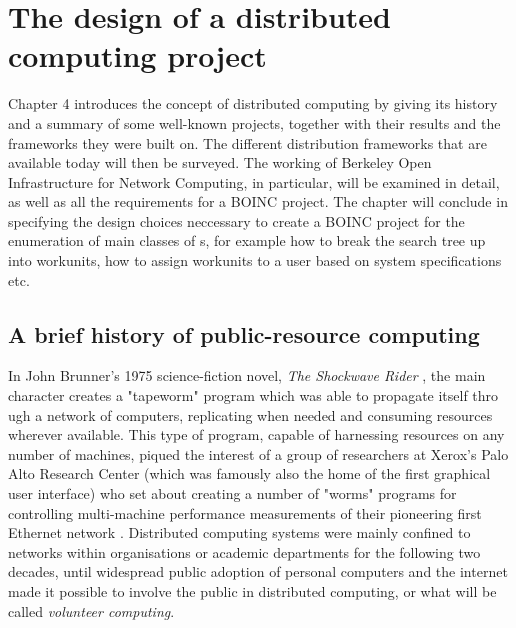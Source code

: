 \chapter{The design of a distributed computing project}
\vspace{-2em}
\minitoc

Chapter 4 introduces the concept of distributed computing by  giving its history and a summary of some well-known projects, together with their results and the frameworks they were built on. The different distribution frameworks that are available today will then be surveyed.  The working of Berkeley Open Infrastructure for Network Computing, in particular, will be examined in detail, as well as all the requirements for a BOINC project.  The chapter will conclude in specifying the design choices neccessary to create a  BOINC project for the enumeration of main classes of \lat s, for example how to break the search tree up into workunits, how to assign workunits to a user based on system specifications etc.

\section{A brief history of public-resource computing}
In John Brunner's 1975 science-fiction novel, \emph{The Shockwave Rider} \cite{brunner}, the main character creates a "tapeworm" program which was able to propagate itself thro	ugh a network of computers, replicating when needed and consuming resources wherever available. This type of program, capable of harnessing resources on any number of machines, piqued the interest of a group of researchers at Xerox's Palo Alto Research Center (which was famously also the home of the first graphical user interface) who set about creating a number of "worms" programs for controlling multi-machine performance measurements of their pioneering first Ethernet network \cite{worms}. 
Distributed computing systems were mainly confined to networks within organisations or academic departments for the following two decades, until  widespread public adoption of personal computers and the internet made it possible to involve the public in distributed computing, or what will be called \emph{volunteer computing}.

